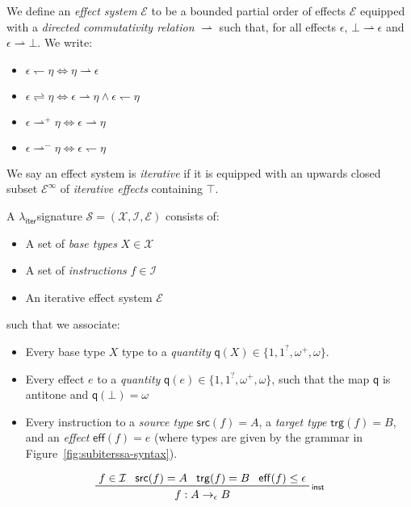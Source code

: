 \documentclass[acmsmall,screen,review]{acmart}
\newcommand{\mc}[1]{\ensuremath{\mathcal{#1}}}
\newcommand{\ms}[1]{\ensuremath{\mathsf{#1}}}
\newcommand{\rle}[1]{{\scriptsize\textsf{#1}}}
\newcommand{\subiterssa}{\(\lambda_{\ms{iter}}\)}
\newcommand{\rightmove}{\rightharpoonup}
\newcommand{\leftmove}{\leftharpoondown}
\newcommand{\slides}{\rightleftharpoons}
\newcommand{\delq}{1^?}
\newcommand{\cpyq}{\omega^+}
\newcommand{\topq}{\omega}
\begin{document}
\begin{definition}
  We define an \emph{effect system} $\mc{E}$ to be a bounded partial order of effects $\mc{E}$
  equipped with a \emph{directed commutativity relation} $\rightmove$ such that, for all effects
  $\epsilon$, $\bot \rightmove \epsilon$ and $\epsilon \rightmove \bot$. We write:
  \begin{itemize}
    \item $\epsilon \leftmove \eta \iff \eta \rightmove \epsilon$
    \item $\epsilon \slides \eta \iff \epsilon \rightmove \eta \land \epsilon \leftmove \eta$
    \item $\epsilon \rightmove^+ \eta \iff \epsilon \rightmove \eta$
    \item $\epsilon \rightmove^- \eta \iff \epsilon \leftmove \eta$
  \end{itemize}
  We say an effect system is \emph{iterative} if it is equipped with an upwards closed subset
  $\mc{E}^\infty$ of \emph{iterative effects} containing $\top$.
\end{definition}

\begin{definition}[\subiterssa-signature]
  A \subiterssa signature $\mc{S} = (\mc{X}, \mc{I}, \mc{E})$ consists of:
  \begin{itemize}
    \item A set of \emph{base types} $X \in \mc{X}$
    \item A set of \emph{instructions} $f \in \mc{I}$
    \item An iterative effect system $\mc{E}$
  \end{itemize}
  such that we associate:
  \begin{itemize}
    \item Every base type $X$ type to a \emph{quantity} $\ms{q}(X) \in \{1, \delq, \cpyq, \topq\}$.
    \item Every effect $e$ to a \emph{quantity} $\ms{q}(e) \in \{1, \delq, \cpyq, \topq\}$, such
    that the map $\ms{q}$ is antitone and $\ms{q}(\bot) = \topq$
    \item Every instruction to a \emph{source type} $\ms{src}(f) = A$, a \emph{target type}
    $\ms{trg}(f) = B$, and an \emph{effect} $\ms{eff}(f) = e$ (where types are given by the grammar
    in Figure~\ref{fig:subiterssa-syntax}).
  \end{itemize}
\end{definition}

\begin{gather*}
  \prftree[r]{\rle{inst}}
    {f \in \mc{I}}
    {\ms{src}(f) = A}
    {\ms{trg}(f) = B}
    {\ms{eff}(f) \leq \epsilon}
    {f : A \to_\epsilon B}
\end{gather*}
\end{document}
